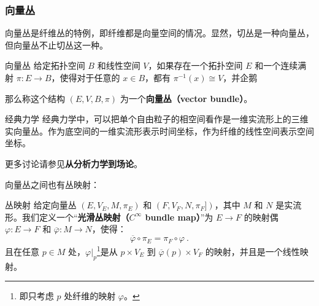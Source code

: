 \subsubsection{向量丛}



向量丛是纤维丛的特例，即纤维都是向量空间的情况。显然，切丛是一种向量丛，但向量丛不止切丛这一种。

\begin{definition}{向量丛}\label{def_Fibre_1}
给定拓扑空间 $B$ 和线性空间 $V$，如果存在一个拓扑空间 $E$ 和一个连续满射 $\pi:E\rightarrow B$，使得对于任意的 $x\in B$，都有 $\pi^{-1}(x)\cong V$，并企鹅


那么称这个结构 $(E, V, B, \pi)$ 为一个\textbf{向量丛（vector bundle）}。
\end{definition}


\begin{example}{经典力学}
经典力学中，可以把单个自由粒子的相空间看作是一维实流形上的三维实向量丛。作为底空间的一维实流形表示时间坐标，作为纤维的线性空间表示空间坐标。

更多讨论请参见\textbf{从分析力学到场论}。
\end{example}





向量丛之间也有丛映射：

\begin{definition}{丛映射}
给定向量丛 $(E, V_E, M, \pi_E)$ 和 $(F, V_F, N, \pi_F])$，其中 $M$ 和 $N$ 是实流形。我们定义一个“\textbf{光滑丛映射（$C^\infty$ bundle map）}”为 $E\rightarrow F$ 的映射偶 $\varphi: E\rightarrow F$ 和 $\overline{\varphi}: M\rightarrow N$，使得：
\begin{equation}
\overline{\varphi}\circ\pi_E=\pi_F\circ\varphi~.
\end{equation}
且在任意 $p\in M$ 处，$\varphi|_p$\footnote{即只考虑 $p$ 处纤维的映射 $\varphi$。}是从 $p\times V_E$ 到 $\overline{\varphi}(p)\times V_F$ 的映射，并且是一个线性映射。
\end{definition}





